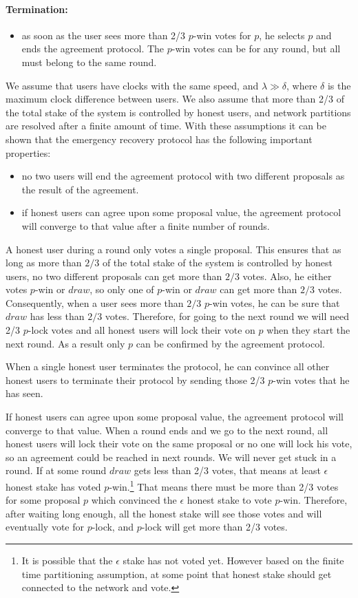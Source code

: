 \paragraph{Termination:}
\begin{itemize}
    \item as soon as the user sees more than 2/3 $p$-win votes for $p$, he selects $p$ and ends
    the agreement protocol. The $p$-win votes can be for any round, but all must belong to the same round.
\end{itemize}


We assume that users have clocks with the same speed, and $\lambda \gg \delta$, where $\delta$ is the maximum
clock difference between users. We also assume that more than 2/3 of the total stake of the system is controlled
by honest users, and network partitions are resolved after a finite amount of time. With these assumptions it can be
shown that the emergency recovery protocol has the following important properties:
\begin{itemize}
    \item no two users will end the agreement protocol with two different proposals as the result of the agreement.
    \item if honest users can agree upon some proposal value, the agreement protocol will converge to that value
    after a finite number of rounds.
\end{itemize}

A honest user during a round only votes a single proposal. This ensures that as long as more than $2/3$ of the total
stake of the system is controlled by honest users, no two different proposals can get more than $2/3$ votes. Also, he
either votes $p$-win or $draw$, so only one of $p$-win or $draw$ can get more than $2/3$ votes. Consequently, when a
user sees more than $2/3$ $p$-win votes, he can be sure that $draw$ has less than $2/3$ votes. Therefore, for going
to the next round we will need 2/3 $p$-lock
votes and all honest users will lock their vote on $p$ when they start the next round. As a result only $p$ can be
confirmed by the agreement protocol.

When a single honest user terminates the protocol, he can convince all other honest users to terminate their protocol
by sending those 2/3 $p$-win votes that he has seen.

If honest users can agree upon some proposal value, the agreement protocol will converge to that value. When a round
ends and we go to the next round, all honest users will lock their vote on
the same proposal or no one will lock his vote, so an agreement could be reached in next rounds. We will never get
stuck in a round. If at some
round $draw$ gets less than 2/3 votes, that means at least $\epsilon$ honest stake has voted
$p$-win.\footnote{It is possible that the $\epsilon$ stake has not voted yet. However based on the finite time
partitioning assumption, at some point that honest stake should get connected to the network and vote.}
That means there must be more than 2/3 votes for some proposal $p$ which convinced the $\epsilon$ honest stake to
vote $p$-win. Therefore, after waiting long enough, all the honest stake will see those votes and will eventually
vote for $p$-lock, and $p$-lock will get more than 2/3 votes.

